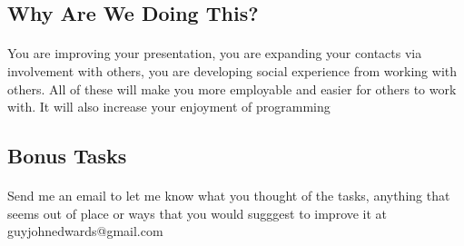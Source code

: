 \documentclass[11pt]{book}
\begin{document}
\subsection{Why Are We Doing This?}

\paragraph{} You are improving your presentation, you are expanding your contacts via involvement with others, you are developing social experience from working with others. All of these will make you more employable and easier for others to work with. It will also increase your enjoyment of programming

\subsection{Bonus Tasks}

\paragraph{} Send me an email to let me know what you thought of the tasks, anything that seems out of place or ways that you would sugggest to improve it at guyjohnedwards@gmail.com
\end{document}
